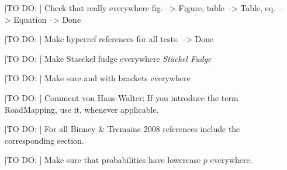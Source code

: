\begin{itemize}
\item[[TO DO:]] Check that really everywhere fig. --> Figure, table --> Table, eq. --> Equation --> Done
\item[[TO DO:]] Make hyperref references for all tests. --> Done
\item[[TO DO:]] Make Staeckel fudge everywhere \emph{St\"{a}ckel Fudge}
\item[[TO DO:]] Make sure \MAP{} and \MAPs{} with brackets everywhere
\item[[TO DO:]] Comment von Hans-Walter: If you introduce the term RoadMapping, use it, whenever applicable.
\item[[TO DO:]] For all Binney \& Tremaine 2008 references include the corresponding section.
\item[[TO DO:]] Make sure that probabilities have lowercase $p$ everywhere.
\end{itemize}


